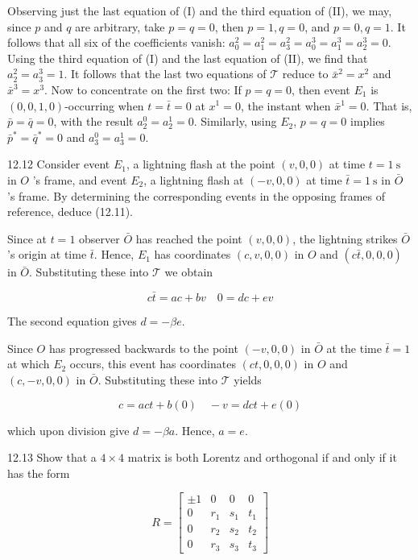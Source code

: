 \documentclass[10pt]{article}
\begin{document}
Observing just the last equation of (I) and the third equation of (II), we may, since $p$ and $q$ are arbitrary, take $p=q=0$, then $p=1, q=0$, and $p=0, q=1$. It follows that all six of the coefficients vanish: $a_{0}^{2}=a_{1}^{2}=a_{3}^{2}=a_{0}^{3}=a_{1}^{3}=a_{2}^{3}=0$. Using the third equation of (I) and the last equation of (II), we find that $a_{2}^{2}=a_{3}^{3}=1$. It follows that the last two equations of $\mathscr{T}$ reduce to $\bar{x}^{2}=x^{2}$ and $\bar{x}^{3}=x^{3}$. Now to concentrate on the first two: If $p=q=0$, then event $E_{1}$ is $(0,0,1,0)$-occurring when $t=\bar{t}=0$ at $x^{1}=0$, the instant when $\bar{x}^{1}=0$. That is, $\bar{p}=\bar{q}=0$, with the result $a_{2}^{0}=a_{2}^{1}=0$. Similarly, using $E_{2}$, $p=q=0$ implies $\bar{p}^{*}=\bar{q}^{*}=0$ and $a_{3}^{0}=a_{3}^{1}=0$.

12.12 Consider event $E_{1}$, a lightning flash at the point $(v, 0,0)$ at time $t=1 \mathrm{~s}$ in $O$ 's frame, and event $E_{2}$, a lightning flash at $(-v, 0,0)$ at time $\bar{t}=1 \mathrm{~s}$ in $\bar{O}$ 's frame. By determining the corresponding events in the opposing frames of reference, deduce (12.11).

Since at $t=1$ observer $\bar{O}$ has reached the point $(v, 0,0)$, the lightning strikes $\bar{O}$ 's origin at time $\bar{t}$. Hence, $E_{1}$ has coordinates $(c, v, 0,0)$ in $O$ and $(c \bar{t}, 0,0,0)$ in $\bar{O}$. Substituting these into $\mathscr{T}$ we obtain

$$
c \bar{t}=a c+b v \quad 0=d c+e v
$$

The second equation gives $d=-\beta e$.

Since $O$ has progressed backwards to the point $(-v, 0,0)$ in $\bar{O}$ at the time $\bar{t}=1$ at which $E_{2}$ occurs, this event has coordinates $(c t, 0,0,0)$ in $O$ and $(c,-v, 0,0)$ in $\bar{O}$. Substituting these into $\mathscr{T}$ yields

$$
c=a c t+b(0) \quad-v=d c t+e(0)
$$

which upon division give $d=-\beta a$. Hence, $a=e$.

12.13 Show that a $4 \times 4$ matrix is both Lorentz and orthogonal if and only if it has the form

\[
R=\left[\begin{array}{rrrr} 
\pm 1 & 0 & 0 & 0  \tag{1}\\
0 & r_{1} & s_{1} & t_{1} \\
0 & r_{2} & s_{2} & t_{2} \\
0 & r_{3} & s_{3} & t_{3}
\end{array}\right]
\]
\end{document}
